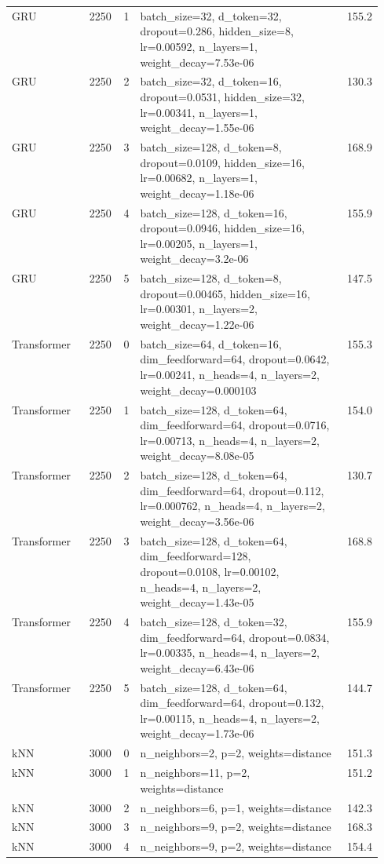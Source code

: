 \begin{longtable}{lrrp{0.55\linewidth}r}
GRU & 2250 & 1 & batch\_size=32, d\_token=32, dropout=0.286, hidden\_size=8, lr=0.00592, n\_layers=1, weight\_decay=7.53e-06 & 155.2 \\
GRU & 2250 & 2 & batch\_size=32, d\_token=16, dropout=0.0531, hidden\_size=32, lr=0.00341, n\_layers=1, weight\_decay=1.55e-06 & 130.3 \\
GRU & 2250 & 3 & batch\_size=128, d\_token=8, dropout=0.0109, hidden\_size=16, lr=0.00682, n\_layers=1, weight\_decay=1.18e-06 & 168.9 \\
GRU & 2250 & 4 & batch\_size=128, d\_token=16, dropout=0.0946, hidden\_size=16, lr=0.00205, n\_layers=1, weight\_decay=3.2e-06 & 155.9 \\
GRU & 2250 & 5 & batch\_size=128, d\_token=8, dropout=0.00465, hidden\_size=16, lr=0.00301, n\_layers=2, weight\_decay=1.22e-06 & 147.5 \\
Transformer & 2250 & 0 & batch\_size=64, d\_token=16, dim\_feedforward=64, dropout=0.0642, lr=0.00241, n\_heads=4, n\_layers=2, weight\_decay=0.000103 & 155.3 \\
Transformer & 2250 & 1 & batch\_size=128, d\_token=64, dim\_feedforward=64, dropout=0.0716, lr=0.00713, n\_heads=4, n\_layers=2, weight\_decay=8.08e-05 & 154.0 \\
Transformer & 2250 & 2 & batch\_size=128, d\_token=64, dim\_feedforward=64, dropout=0.112, lr=0.000762, n\_heads=4, n\_layers=2, weight\_decay=3.56e-06 & 130.7 \\
Transformer & 2250 & 3 & batch\_size=128, d\_token=64, dim\_feedforward=128, dropout=0.0108, lr=0.00102, n\_heads=4, n\_layers=2, weight\_decay=1.43e-05 & 168.8 \\
Transformer & 2250 & 4 & batch\_size=128, d\_token=32, dim\_feedforward=64, dropout=0.0834, lr=0.00335, n\_heads=4, n\_layers=2, weight\_decay=6.43e-06 & 155.9 \\
Transformer & 2250 & 5 & batch\_size=128, d\_token=64, dim\_feedforward=64, dropout=0.132, lr=0.00115, n\_heads=4, n\_layers=2, weight\_decay=1.73e-06 & 144.7 \\
\midrule
kNN & 3000 & 0 & n\_neighbors=2, p=2, weights=distance & 151.3 \\
kNN & 3000 & 1 & n\_neighbors=11, p=2, weights=distance & 151.2 \\
kNN & 3000 & 2 & n\_neighbors=6, p=1, weights=distance & 142.3 \\
kNN & 3000 & 3 & n\_neighbors=9, p=2, weights=distance & 168.3 \\
kNN & 3000 & 4 & n\_neighbors=9, p=2, weights=distance & 154.4 \\

\end{longtable}
